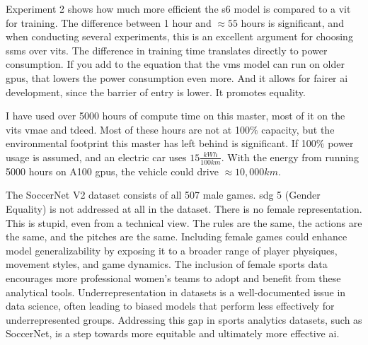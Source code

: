 Experiment 2 shows how much more efficient the \acrshort{s6} model is compared to a \acrshort{vit} for training. The difference between 1 hour and $\approx55$ hours is significant, and when conducting several experiments, this is an excellent argument for choosing \acrshort{ssm}s over \acrshort{vit}s. The difference in training time translates directly to power consumption. If you add to the equation that the \acrshort{vms} model can run on older \acrshort{gpu}s, that lowers the power consumption even more. And it allows for fairer \acrfull{ai} development, since the barrier of entry is lower. It promotes equality. 

I have used over 5000 hours of compute time on this master, most of it on the \acrlong{vit}s \acrshort{vmae} and \acrshort{tdeed}. Most of these hours are not at 100$\%$ capacity, but the environmental footprint this master has left behind is significant. If 100$\%$ power usage is assumed, and an electric car uses $15\frac{kWh}{100km}$. With the energy from running 5000 hours on A100 \acrshort{gpu}s, the vehicle could drive $\approx10,000 km$. 

The SoccerNet V2 dataset consists of all 507 male games. \acrshort{sdg} 5 (Gender Equality) is not addressed at all in the dataset. There is no female representation. This is stupid, even from a technical view. The rules are the same, the actions are the same, and the pitches are the same. Including female games could enhance model generalizability by exposing it to a broader range of player physiques, movement styles, and game dynamics. The inclusion of female sports data encourages more professional women's teams to adopt and benefit from these analytical tools. Underrepresentation in datasets is a well-documented issue in data science, often leading to biased models that perform less effectively for underrepresented groups. Addressing this gap in sports analytics datasets, such as SoccerNet, is a step towards more equitable and ultimately more effective \acrshort{ai}.